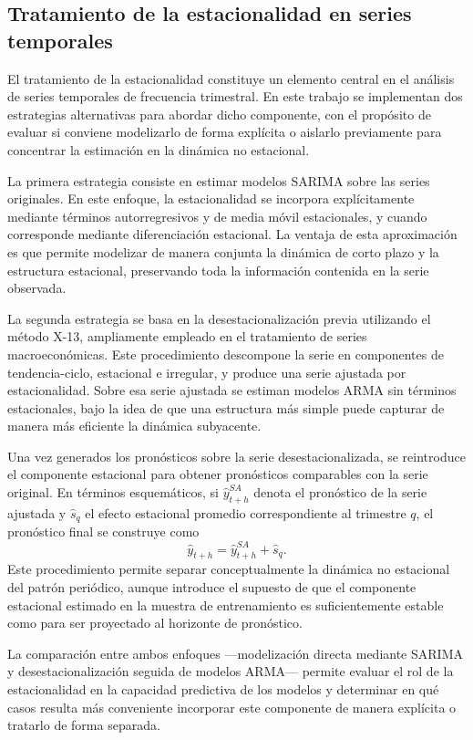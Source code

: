 \documentclass[11pt]{article}
\begin{document}
\subsection{Tratamiento de la estacionalidad en series temporales}

El tratamiento de la estacionalidad constituye un elemento central en el análisis de series temporales de frecuencia trimestral. En este trabajo se implementan dos estrategias alternativas para abordar dicho componente, con el propósito de evaluar si conviene modelizarlo de forma explícita o aislarlo previamente para concentrar la estimación en la dinámica no estacional.

La primera estrategia consiste en estimar modelos SARIMA sobre las series originales. En este enfoque, la estacionalidad se incorpora explícitamente mediante términos autorregresivos y de media móvil estacionales, y cuando corresponde mediante diferenciación estacional. La ventaja de esta aproximación es que permite modelizar de manera conjunta la dinámica de corto plazo y la estructura estacional, preservando toda la información contenida en la serie observada.

La segunda estrategia se basa en la desestacionalización previa utilizando el método X-13, ampliamente empleado en el tratamiento de series macroeconómicas. Este procedimiento descompone la serie en componentes de tendencia-ciclo, estacional e irregular, y produce una serie ajustada por estacionalidad. Sobre esa serie ajustada se estiman modelos ARMA sin términos estacionales, bajo la idea de que una estructura más simple puede capturar de manera más eficiente la dinámica subyacente.

Una vez generados los pronósticos sobre la serie desestacionalizada, se reintroduce el componente estacional para obtener pronósticos comparables con la serie original. En términos esquemáticos, si $\widehat{y}^{SA}_{t+h}$ denota el pronóstico de la serie ajustada y $\widehat{s}_{q}$ el efecto estacional promedio correspondiente al trimestre $q$, el pronóstico final se construye como
\[
\widehat{y}_{t+h} = \widehat{y}^{SA}_{t+h} + \widehat{s}_{q}.
\]
Este procedimiento permite separar conceptualmente la dinámica no estacional del patrón periódico, aunque introduce el supuesto de que el componente estacional estimado en la muestra de entrenamiento es suficientemente estable como para ser proyectado al horizonte de pronóstico.

La comparación entre ambos enfoques ---modelización directa mediante SARIMA y desestacionalización seguida de modelos ARMA--- permite evaluar el rol de la estacionalidad en la capacidad predictiva de los modelos y determinar en qué casos resulta más conveniente incorporar este componente de manera explícita o tratarlo de forma separada.
\end{document}
